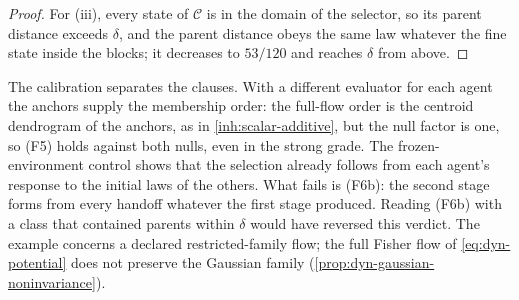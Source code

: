 \begin{proof}
For (iii), every state of $\mathcal C$ is in the domain of the selector, so
its parent distance exceeds $\delta$, and the parent distance obeys the same
law whatever the fine state inside the blocks; it decreases to $53/120$ and
reaches $\delta$ from above.
\end{proof}

The calibration separates the clauses. With a different evaluator for each
agent the anchors supply the membership order: the full-flow order is the
centroid dendrogram of the anchors, as in \cref{inh:scalar-additive}, but the
null factor is one, so (F5) holds against both nulls, even in the strong
grade. The frozen-environment control shows that the selection already
follows from each agent's response to the initial laws of the others. What
fails is (F6b): the second stage forms from every handoff whatever the first
stage produced. Reading (F6b) with a class that contained parents within
$\delta$ would have reversed this verdict. The example concerns a declared
restricted-family flow; the full Fisher flow of \cref{eq:dyn-potential} does
not preserve the Gaussian family (\cref{prop:dyn-gaussian-noninvariance}).

